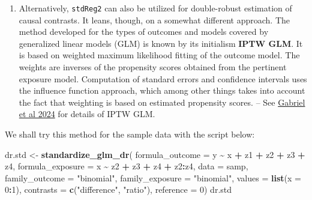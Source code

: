 \documentclass[
]{book}
\newenvironment{Shaded}{\begin{snugshade}}{\end{snugshade}}
\newcommand{\AttributeTok}[1]{\textcolor[rgb]{0.13,0.29,0.53}{#1}}
\newcommand{\DecValTok}[1]{\textcolor[rgb]{0.00,0.00,0.81}{#1}}
\newcommand{\FunctionTok}[1]{\textcolor[rgb]{0.13,0.29,0.53}{\textbf{#1}}}
\newcommand{\NormalTok}[1]{#1}
\newcommand{\OtherTok}[1]{\textcolor[rgb]{0.56,0.35,0.01}{#1}}
\newcommand{\SpecialCharTok}[1]{\textcolor[rgb]{0.81,0.36,0.00}{\textbf{#1}}}
\newcommand{\StringTok}[1]{\textcolor[rgb]{0.31,0.60,0.02}{#1}}
\providecommand{\tightlist}{%
  \setlength{\itemsep}{0pt}\setlength{\parskip}{0pt}}
\theoremstyle{definition}
\theoremstyle{definition}
\theoremstyle{definition}
\theoremstyle{definition}
\theoremstyle{remark}
\begin{document}
\begin{enumerate}
\def\labelenumi{\arabic{enumi}.}
\setcounter{enumi}{2}
\tightlist
\item
  Alternatively, \texttt{stdReg2} can also be utilized for double-robust
  estimation of causal contrasts. It leans, though, on a somewhat
  different approach. The method developed for the types of outcomes
  and models covered by generalized linear models (GLM) is known by
  its initialism \textbf{IPTW GLM}. It is based on weighted maximum
  likelihood fitting of the outcome model. The weights are inverses of
  the propensity scores obtained from the pertinent exposure model.
  Computation of standard errors and confidence intervals uses the
  influence function approach, which among other things takes into
  account the fact that weighting is based on estimated propensity
  scores. -- See \href{https://doi.org/10.1002/sim.9969}{Gabriel et al
  2024} for details of IPTW GLM.
\end{enumerate}

We shall try this method for the sample data with the script below:

\begin{Shaded}
\begin{Highlighting}[]
\NormalTok{dr.std }\OtherTok{\textless{}{-}} \FunctionTok{standardize\_glm\_dr}\NormalTok{(}
          \AttributeTok{formula\_outcome =}\NormalTok{ y }\SpecialCharTok{\textasciitilde{}}\NormalTok{ x }\SpecialCharTok{+}\NormalTok{ z1 }\SpecialCharTok{+}\NormalTok{ z2 }\SpecialCharTok{+}\NormalTok{ z3 }\SpecialCharTok{+}\NormalTok{ z4, }
          \AttributeTok{formula\_exposure =}\NormalTok{ x }\SpecialCharTok{\textasciitilde{}}\NormalTok{ z2 }\SpecialCharTok{+}\NormalTok{ z3 }\SpecialCharTok{+}\NormalTok{ z4 }\SpecialCharTok{+}\NormalTok{ z2}\SpecialCharTok{:}\NormalTok{z4,}
          \AttributeTok{data =}\NormalTok{ samp,}
          \AttributeTok{family\_outcome =} \StringTok{"binomial"}\NormalTok{, }
          \AttributeTok{family\_exposure =} \StringTok{"binomial"}\NormalTok{,}
          \AttributeTok{values =} \FunctionTok{list}\NormalTok{(}\AttributeTok{x =} \DecValTok{0}\SpecialCharTok{:}\DecValTok{1}\NormalTok{), }
          \AttributeTok{contrasts =} \FunctionTok{c}\NormalTok{(}\StringTok{"difference"}\NormalTok{, }\StringTok{"ratio"}\NormalTok{), }\AttributeTok{reference =} \DecValTok{0}\NormalTok{)}
\NormalTok{dr.std}
\end{Highlighting}
\end{Shaded}
\end{document}
